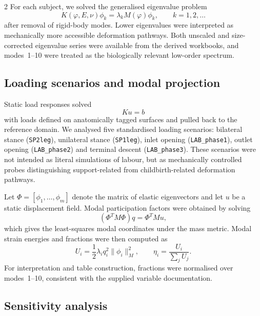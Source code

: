 \documentclass[openacc]{rsproca_new}
\begin{document}
\begin{multicols}{2}
For each subject, we solved the generalised eigenvalue problem
\begin{equation}
K(\varphi,E,\nu)\phi_{k} = \lambda_{k} M(\varphi)\phi_{k}, \qquad k=1,2,\ldots
\end{equation}
after removal of rigid-body modes. Lower eigenvalues were interpreted as mechanically more accessible deformation pathways. Both unscaled and size-corrected eigenvalue series were available from the derived workbooks, and modes~1--10 were treated as the biologically relevant low-order spectrum.

\subsection{Loading scenarios and modal projection}

Static load responses solved
\begin{equation}
Ku=b
\end{equation}
with loads defined on anatomically tagged surfaces and pulled back to the reference domain. We analysed five standardised loading scenarios: bilateral stance (\texttt{SP2leg}), unilateral stance (\texttt{SP1leg}), inlet opening (\texttt{LAB\_phase1}), outlet opening (\texttt{LAB\_phase2}) and terminal descent (\texttt{LAB\_phase3}). These scenarios were not intended as literal simulations of labour, but as mechanically controlled probes distinguishing support-related from childbirth-related deformation pathways.

Let $\Phi=[\phi_{1},\ldots,\phi_{m}]$ denote the matrix of elastic eigenvectors and let $u$ be a static displacement field. Modal participation factors were obtained by solving
\begin{equation}
(\Phi^{T}M\Phi)q=\Phi^{T}Mu,
\end{equation}
which gives the least-squares modal coordinates under the mass metric. Modal strain energies and fractions were then computed as
\begin{equation}
U_{i}=\frac{1}{2}\lambda_{i}q_{i}^{2}\|\phi_{i}\|_{M}^{2}, \qquad
\eta_{i}=\frac{U_{i}}{\sum_{j}U_{j}}.
\end{equation}
For interpretation and table construction, fractions were normalised over modes~1--10, consistent with the supplied variable documentation.

\subsection{Sensitivity analysis}


\end{multicols}
\end{document}
